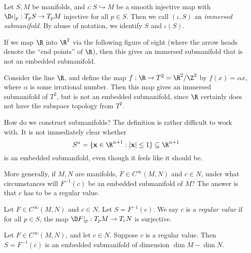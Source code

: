 \documentclass[a4paper]{article}
\begin{document}
\begin{defi}
  Let $S, M$ be manifolds, and $\iota: S \hookrightarrow M$ be a smooth injective map with $\D\iota|_p : T_p S \to T_p M$ injective for all $p \in S$. Then we call $(\iota, S)$ an \emph{immersed submanifold}. By abuse of notation, we identify $S$ and $\iota(S)$.
\end{defi}

\begin{eg}
  If we map $\R$ into $\R^2$ via the following figure of eight (where the arrow heads denote the ``end points'' of $\R$), then this gives an immersed submanifold that is not an embedded submanifold.
  \begin{center}
  \end{center}
\end{eg}

\begin{eg}
  Consider the line $\R$, and define the map $f: \R \to T^2 = \R^2 / \Z^2$ by $f(x) = \alpha x$, where $\alpha$ is some irrational number. Then this map gives an immersed submanifold of $T^2$, but is not an embedded submanifold, since $\R$ certainly does not have the subspace topology from $T^2$.
\end{eg}

How do we construct submanifolds? The definition is rather difficult to work with. It is not immediately clear whether
\[
  S^n = \{\mathbf{x} \in \R^{n + 1}: |\mathbf{x}| \leq 1\} \subseteq \R^{n + 1}
\]
is an embedded submanifold, even though it feels like it should be.

More generally, if $M, N$ are manifolds, $F \in C^\infty(M, N)$ and $c \in N$, under what circumstances will $F^{-1}(c)$ be an embedded submanifold of $M$? The answer is that $c$ has to be a regular value.
\begin{defi}
  Let $F \in C^\infty(M, N)$ and $c \in N$. Let $S = F^{-1}(c)$. We say $c$ is a \emph{regular value} if for all $p \in S$, the map $\D F|_p: T_p M \to T_c N$ is surjective.
\end{defi}

\begin{prop}
  Let $F \in C^\infty(M, N)$, and let $c \in N$. Suppose $c$ is a regular value. Then $S = F^{-1}(c)$ is an embedded submanifold of dimension $\dim M - \dim N$.
\end{prop}
\end{document}
